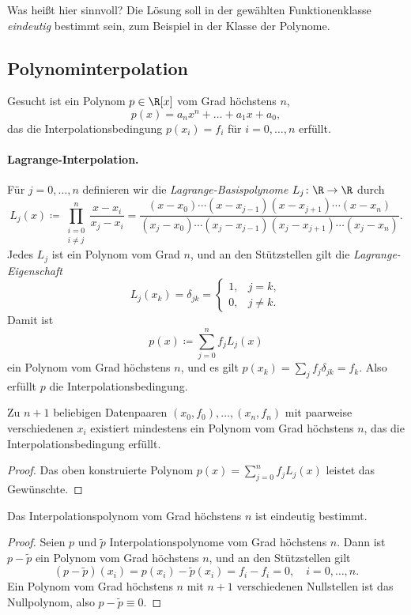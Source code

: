 \documentclass[11pt]{article}
\begin{document}
Was heißt hier \glqq sinnvoll\grqq{}? Die Lösung soll in der gewählten Funktionenklasse \textit{eindeutig} bestimmt sein, zum Beispiel in der Klasse der Polynome.

\subsection{Polynominterpolation}

Gesucht ist ein Polynom $p \in \R[x]$ vom Grad höchstens $n$,
\[ p(x) = a_n x^n + \dots + a_1 x + a_0, \]
das die Interpolationsbedingung $p(x_i) = f_i$ für $i = 0, \dots, n$ erfüllt.

\paragraph{Lagrange-Interpolation.}
Für $j = 0, \dots, n$ definieren wir die \emph{Lagrange-Basispolynome} $L_j\colon \R \to \R$ durch
\[
  L_j(x) \coloneqq \prod_{\substack{i=0 \\ i \neq j}}^{n} \frac{x - x_i}{x_j - x_i}
  = \frac{(x - x_0) \dotsm (x - x_{j-1})(x - x_{j+1}) \dotsm (x - x_n)}{(x_j - x_0) \dotsm (x_j - x_{j-1})(x_j - x_{j+1}) \dotsm (x_j - x_n)}.
\]
Jedes $L_j$ ist ein Polynom vom Grad $n$, und an den Stützstellen gilt die \textit{Lagrange-Eigenschaft}
\[
  L_j(x_k) = \delta_{jk} = \begin{cases} 1, & j = k, \\ 0, & j \neq k. \end{cases}
\]
Damit ist
\[ p(x) \coloneqq \sum_{j=0}^{n} f_j L_j(x) \]
ein Polynom vom Grad höchstens $n$, und es gilt $p(x_k) = \sum_{j} f_j \delta_{jk} = f_k$. Also erfüllt $p$ die Interpolationsbedingung.

\begin{theorem}\Theorem
  Zu $n+1$ beliebigen Datenpaaren $(x_0, f_0), \dots, (x_n, f_n)$ mit paarweise verschiedenen $x_i$ existiert mindestens ein Polynom vom Grad höchstens $n$, das die Interpolationsbedingung erfüllt.
\end{theorem}
\begin{proof}
  Das oben konstruierte Polynom $p(x) = \sum_{j=0}^n f_j L_j(x)$ leistet das Gewünschte.
\end{proof}

\begin{theorem}\Theorem
  Das Interpolationspolynom vom Grad höchstens $n$ ist eindeutig bestimmt.
\end{theorem}
\begin{proof}
  Seien $p$ und $\tilde{p}$ Interpolationspolynome vom Grad höchstens $n$.
  Dann ist $p - \tilde{p}$ ein Polynom vom Grad höchstens $n$, und an den Stützstellen gilt
  \[ (p - \tilde{p})(x_i) = p(x_i) - \tilde{p}(x_i) = f_i - f_i = 0, \quad i = 0, \dots, n. \]
  Ein Polynom vom Grad höchstens $n$ mit $n+1$ verschiedenen Nullstellen ist das Nullpolynom, also $p - \tilde{p} \equiv 0$.
\end{proof}
\end{document}
